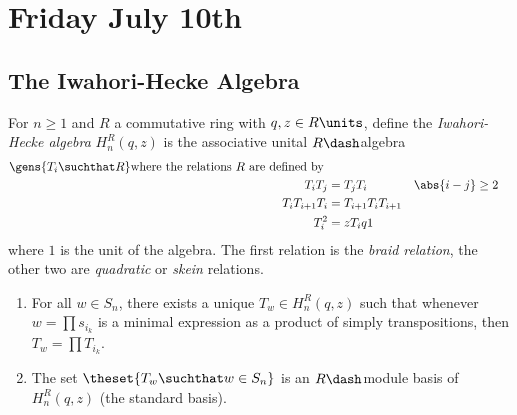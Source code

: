 \hypertarget{friday-july-10th}{%
\section{Friday July 10th}\label{friday-july-10th}}

\hypertarget{the-iwahori-hecke-algebra}{%
\subsection{The Iwahori-Hecke Algebra}\label{the-iwahori-hecke-algebra}}

\begin{definition}

For \(n\geq 1\) and \(R\) a commutative ring with \(q,z \in R\units\),
define the \emph{Iwahori-Hecke algebra} \(H_n^R(q, z)\) is the
associative unital \(R\dash\)algebra
\begin{align*}
\gens{T_i \suchthat R} \text{where the relations $R$ are defined by } \\
T_i T_j &= T_j T_i && \abs{i - j} \geq 2 \\
T_i T_{i+1} T_i &= T_{i+1} T_i T_{i+1} \\
T_i^2 &= zT_i q1
\end{align*} where \(1\) is the unit of the algebra. The first relation
is the \emph{braid relation}, the other two are \emph{quadratic} or
\emph{skein} relations.

\end{definition}

\begin{theorem}

\hfill

\begin{enumerate}
\def\labelenumi{\arabic{enumi}.}
\tightlist
\item
  For all \(w \in S_n\), there exists a unique \(T_w\in H_n^R(q, z)\)
  such that whenever \(w = \prod s_{i_k}\) is a minimal expression as a
  product of simply transpositions, then \(T_w = \prod T_{i_k}\).
\item
  The set \(\theset {T_w \suchthat w\in S_n}\) is an \(R\dash\)module
  basis of \(H_n^R(q, z)\) (the standard basis).
\end{enumerate}

\end{theorem}

